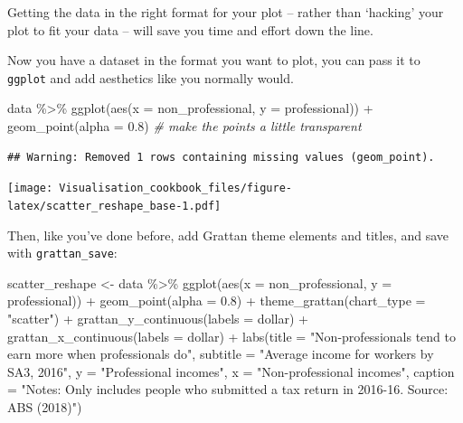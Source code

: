 \documentclass[
]{book}
\newenvironment{Shaded}{\begin{snugshade}}{\end{snugshade}}
\newcommand{\AttributeTok}[1]{\textcolor[rgb]{0.77,0.63,0.00}{#1}}
\newcommand{\CommentTok}[1]{\textcolor[rgb]{0.56,0.35,0.01}{\textit{#1}}}
\newcommand{\FloatTok}[1]{\textcolor[rgb]{0.00,0.00,0.81}{#1}}
\newcommand{\FunctionTok}[1]{\textcolor[rgb]{0.00,0.00,0.00}{#1}}
\newcommand{\NormalTok}[1]{#1}
\newcommand{\OtherTok}[1]{\textcolor[rgb]{0.56,0.35,0.01}{#1}}
\newcommand{\SpecialCharTok}[1]{\textcolor[rgb]{0.00,0.00,0.00}{#1}}
\newcommand{\StringTok}[1]{\textcolor[rgb]{0.31,0.60,0.02}{#1}}
\begin{document}
Getting the data in the right format for your plot -- rather than `hacking' your plot to fit your data -- will save you time and effort down the line.

Now you have a dataset in the format you want to plot, you can pass it to \texttt{ggplot} and add aesthetics like you normally would.

\begin{Shaded}
\begin{Highlighting}[]
\NormalTok{data }\SpecialCharTok{\%\textgreater{}\%} 
  \FunctionTok{ggplot}\NormalTok{(}\FunctionTok{aes}\NormalTok{(}\AttributeTok{x =}\NormalTok{ non\_professional,}
             \AttributeTok{y =}\NormalTok{ professional)) }\SpecialCharTok{+} 
  \FunctionTok{geom\_point}\NormalTok{(}\AttributeTok{alpha =} \FloatTok{0.8}\NormalTok{) }\CommentTok{\# make the points a little transparent}
\end{Highlighting}
\end{Shaded}

\begin{verbatim}
## Warning: Removed 1 rows containing missing values (geom_point).
\end{verbatim}

\texttt{[image: Visualisation\_cookbook\_files/figure-latex/scatter\_reshape\_base-1.pdf]}

Then, like you've done before, add Grattan theme elements and titles, and save with \texttt{grattan\_save}:

\begin{Shaded}
\begin{Highlighting}[]
\NormalTok{scatter\_reshape }\OtherTok{\textless{}{-}}\NormalTok{ data }\SpecialCharTok{\%\textgreater{}\%} 
  \FunctionTok{ggplot}\NormalTok{(}\FunctionTok{aes}\NormalTok{(}\AttributeTok{x =}\NormalTok{ non\_professional,}
             \AttributeTok{y =}\NormalTok{ professional)) }\SpecialCharTok{+} 
  \FunctionTok{geom\_point}\NormalTok{(}\AttributeTok{alpha =} \FloatTok{0.8}\NormalTok{) }\SpecialCharTok{+} 
  \FunctionTok{theme\_grattan}\NormalTok{(}\AttributeTok{chart\_type =} \StringTok{"scatter"}\NormalTok{) }\SpecialCharTok{+} 
  \FunctionTok{grattan\_y\_continuous}\NormalTok{(}\AttributeTok{labels =}\NormalTok{ dollar) }\SpecialCharTok{+} 
  \FunctionTok{grattan\_x\_continuous}\NormalTok{(}\AttributeTok{labels =}\NormalTok{ dollar) }\SpecialCharTok{+}
  \FunctionTok{labs}\NormalTok{(}\AttributeTok{title =} \StringTok{"Non{-}professionals tend to earn more when professionals do"}\NormalTok{,}
       \AttributeTok{subtitle =} \StringTok{"Average income for workers by SA3, 2016"}\NormalTok{,}
       \AttributeTok{y =} \StringTok{"Professional incomes"}\NormalTok{,}
       \AttributeTok{x =} \StringTok{"Non{-}professional incomes"}\NormalTok{,}
       \AttributeTok{caption =} \StringTok{"Notes: Only includes people who submitted a tax return in 2016{-}16. Source: ABS (2018)"}\NormalTok{)}
\end{Highlighting}
\end{Shaded}
\end{document}
